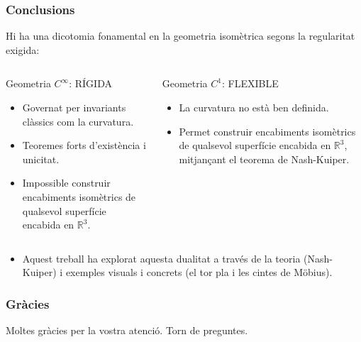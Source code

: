 \documentclass[aspectratio=169]{beamer}
\begin{document}
\begin{frame}
    \frametitle{Conclusions}
    
    Hi ha una dicotomia fonamental en la geometria isomètrica segons la regularitat exigida:
    
    \begin{columns}[T]
      \begin{column}{0.5\textwidth}
        \begin{alertblock}{Geometria $C^\infty$: RÍGIDA}
          \begin{itemize}
              \item Governat per invariants clàssics com la curvatura.
              \item Teoremes forts d'existència i unicitat.
              \item Impossible construir encabiments isomètrics de qualsevol superfície encabida en $\mathbb{R}^3$.
          \end{itemize}
        \end{alertblock}
      \end{column}
      \begin{column}{0.5\textwidth}
        \begin{block}{Geometria $C^1$: FLEXIBLE}
          \begin{itemize}
              \item La curvatura no està ben definida.
              \item Permet construir encabiments isomètrics de qualsevol superfície encabida en $\mathbb{R}^3$, mitjançant el teorema de Nash-Kuiper.
          \end{itemize}
        \end{block}
      \end{column}
    \end{columns}
    
    \vfill
    
    \begin{itemize}
      \item Aquest treball ha explorat aquesta dualitat a través de la teoria (Nash-Kuiper) i exemples visuals i concrets (el tor pla i les cintes de Möbius).
    \end{itemize}
  \end{frame}

\begin{frame}
  \frametitle{Gràcies}
  
  \vfill
  \centering
  \Huge
  Moltes gràcies per la vostra atenció.
  \vfill
  \Large
  Torn de preguntes.
  
\end{frame}
\end{document}
